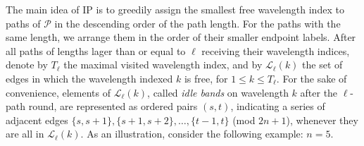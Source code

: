 \documentclass[journal,draftcls,onecolumn,12pt,twoside]{IEEEtran}
\begin{document}
\medskip

The main idea of IP is to greedily assign the smallest free wavelength index to paths of $\mathcal{P}$ in the descending order of the path length.
For the paths with the same length, we arrange them in the order of their smaller endpoint labels.
After all paths of lengths lager than or equal to $\ell$ receiving their wavelength indices, denote by $T_{\ell}$ the maximal visited wavelength index, and by $\mathcal{L}_{\ell}(k)$ the set of edges in which the wavelength indexed $k$ is free, for $1\leq k\leq T_{\ell}$.
For the sake of convenience, elements of $\mathcal{L}_{\ell}(k)$, called \emph{idle bands} on wavelength $k$ after the $\ell$-path round, are represented as ordered pairs $(s,t)$, indicating a series of adjacent edges $\{s,s+1\}, \{s+1,s+2\}, \ldots, \{t-1,t\}$ (mod $2n+1$), whenever they are all in $\mathcal{L}_{\ell}(k)$.
As an illustration, consider the following example: $n=5$.
\end{document}
